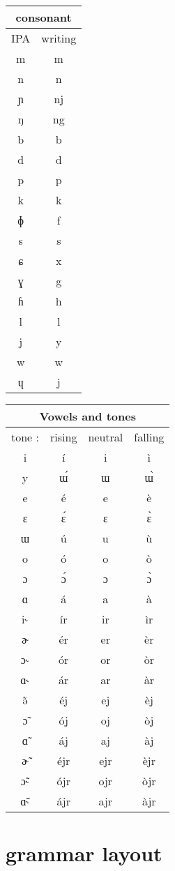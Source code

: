 \documentclass{article}
\begin{document}
\begin{tabular}{|c|c|}
\hline
\multicolumn{2}{|c|}{consonant}\\
\hline
\hline
IPA & writing \\
\hline
m & m \\
n & n \\
ɲ & nj \\
ŋ & ng \\
b & b \\
d & d \\
p & p \\
k & k \\
ɸ & f \\
s & s \\
ɕ & x \\
ɣ & g \\
ɦ & h \\
l & l \\
j & y \\
w & w \\
ɥ & j \\
\hline
\end{tabular}
\begin{tabular}{|c|ccc|}
\hline
\multicolumn{4}{|c|}{Vowels and tones}\\
\hline
\hline
tone : & rising & neutral & falling \\
\hline
i&í&i&ì\\
y&ɯ́&ɯ&ɯ̀\\
e&é&e&è\\
ɛ&ɛ́&ɛ&ɛ̀\\
ɯ&ú&u&ù\\
o&ó&o&ò\\
ɔ&ɔ́&ɔ&ɔ̀\\
ɑ&á&a&à\\
i˞&ír&ir&ìr\\
ɚ&ér&er&èr\\
ɔ˞&ór&or&òr\\
ɑ˞&ár&ar&àr\\
ə̃&éj&ej&èj\\
ɔ̃&ój&oj&òj\\
ɑ̃&áj&aj&àj\\
ɚ̃&éjr&ejr&èjr\\
ɔ̃˞&ójr&ojr&òjr\\
ɑ̃˞&ájr&ajr&àjr\\
\hline
\end{tabular}

\section{grammar layout}
\end{document}
